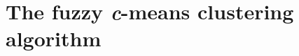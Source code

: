 \chapter{The fuzzy \textit{c}-means clustering algorithm}
\normalsize
\label{The fuzzy c-means clustering algorithm}
